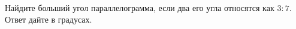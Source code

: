 \begin{ex}
	\begin{condition}
		Найдите больший угол параллелограмма, если два его угла относятся как \( 3 : 7 \). Ответ дайте в градусах.
	\end{condition}
\end{ex}